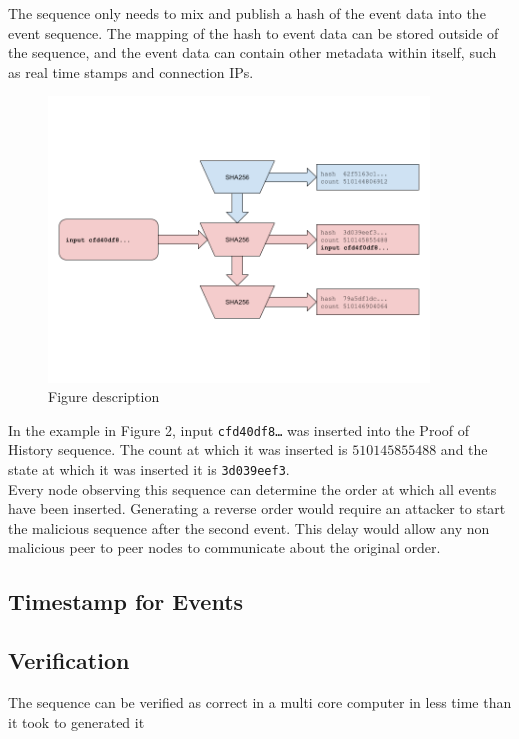 \documentclass[12pt]{article}
\begin{document}
The sequence only needs to mix and publish a hash of the event data into the event sequence. The mapping of the hash to event data can be stored outside of the sequence, and the event data can contain other metadata within itself, such as real time stamps and connection IPs.\\

\begin{figure}
  \begin{center}
    \centering
    \includegraphics[width=0.9\textwidth]{figures/fig_2.png}
    \caption[Fig 2]{Figure description \label{fig_2}}
  \end{center}
  \end{figure}

  In the example in Figure 2, input \texttt{cfd40df8\ldots} was inserted into the Proof of History sequence. The count at which it was inserted is $510145855488$ and the state at which it was inserted it is \texttt{3d039eef3}.\\

Every node observing this sequence can determine the order at which all events have been inserted. Generating a reverse order would require an attacker to start the malicious sequence after the second event. This delay would allow any non malicious peer to peer nodes to communicate about the original order.\\

\subsection{Timestamp for Events}
\subsection{Verification}
The sequence can be verified as correct in a multi core computer in less time than it took to generated it 
\end{document}
